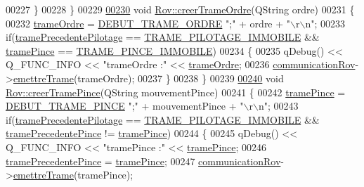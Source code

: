 \begin{DoxyCode}
00227     \}
00228 \}
00229 
\hyperlink{class_rov_a9e80eccfada890561e8af1f3426f6a2b}{00230} \textcolor{keywordtype}{void} \hyperlink{class_rov_a9e80eccfada890561e8af1f3426f6a2b}{Rov::creerTrameOrdre}(QString ordre)
00231 \{
00232     \hyperlink{class_rov_aa813010d76738e268a4bbe3773663a38}{trameOrdre} = \hyperlink{rov_8h_a8b313ffefec16809296d06146e0e75c8}{DEBUT\_TRAME\_ORDRE} \textcolor{stringliteral}{";"} + ordre + \textcolor{stringliteral}{"\(\backslash\)r\(\backslash\)n"};
00233     \textcolor{keywordflow}{if}(\hyperlink{class_rov_a12b08128a49ca43fc1198fdeb6a6f0cd}{tramePrecedentePilotage} == \hyperlink{rov_8h_ab218eea9b0b6d799e400a0d1ff835c13}{TRAME\_PILOTAGE\_IMMOBILE} && 
      \hyperlink{class_rov_a2c24d7c884d8fae07e452105037f8e2c}{tramePince} == \hyperlink{rov_8h_ab46e52d96e193353eadd9cd7f598f670}{TRAME\_PINCE\_IMMOBILE})
00234     \{
00235         qDebug() << Q\_FUNC\_INFO << \textcolor{stringliteral}{"trameOrdre :"} << \hyperlink{class_rov_aa813010d76738e268a4bbe3773663a38}{trameOrdre};
00236         \hyperlink{class_rov_a8e7aaa17ee2134f26d57241d11ab2a99}{communicationRov}->\hyperlink{class_communication_rov_a4f52076db8d6e78abe1745fa1e235272}{emettreTrame}(trameOrdre);
00237     \}
00238 \}
00239 
\hyperlink{class_rov_a66be7f6ff6e20da160d55e0cd0605965}{00240} \textcolor{keywordtype}{void} \hyperlink{class_rov_a66be7f6ff6e20da160d55e0cd0605965}{Rov::creerTramePince}(QString mouvementPince)
00241 \{
00242     \hyperlink{class_rov_a2c24d7c884d8fae07e452105037f8e2c}{tramePince} = \hyperlink{rov_8h_ab9dc0e136712ab8227078e19a43e166a}{DEBUT\_TRAME\_PINCE} \textcolor{stringliteral}{";"} + mouvementPince + \textcolor{stringliteral}{"\(\backslash\)r\(\backslash\)n"};
00243     \textcolor{keywordflow}{if}(\hyperlink{class_rov_a12b08128a49ca43fc1198fdeb6a6f0cd}{tramePrecedentePilotage} == \hyperlink{rov_8h_ab218eea9b0b6d799e400a0d1ff835c13}{TRAME\_PILOTAGE\_IMMOBILE} && 
      \hyperlink{class_rov_aa8ee68edaa542473e1e5ea6bc24432ce}{tramePrecedentePince} != \hyperlink{class_rov_a2c24d7c884d8fae07e452105037f8e2c}{tramePince})
00244     \{
00245         qDebug() << Q\_FUNC\_INFO << \textcolor{stringliteral}{"tramePince :"} << \hyperlink{class_rov_a2c24d7c884d8fae07e452105037f8e2c}{tramePince};
00246         \hyperlink{class_rov_aa8ee68edaa542473e1e5ea6bc24432ce}{tramePrecedentePince} = \hyperlink{class_rov_a2c24d7c884d8fae07e452105037f8e2c}{tramePince};
00247         \hyperlink{class_rov_a8e7aaa17ee2134f26d57241d11ab2a99}{communicationRov}->\hyperlink{class_communication_rov_a4f52076db8d6e78abe1745fa1e235272}{emettreTrame}(tramePince);

\end{DoxyCode}
